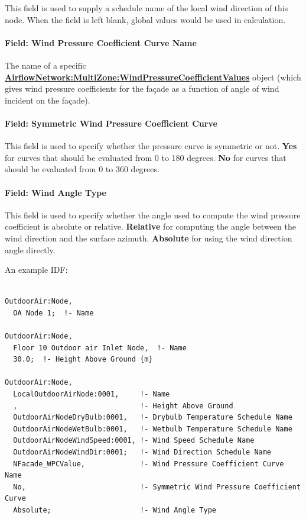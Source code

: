 This field is used to supply a schedule name of the local wind direction of this node. When the field is left blank, global values would be used in calculation.

\paragraph{Field: Wind Pressure Coefficient Curve Name}\label{field-wind-pressure-coeff-curve-name}

The name of a specific \textbf{\hyperref[airflownetworkmultizonewindpressurecoefficientvalues]{AirflowNetwork:MultiZone:WindPressureCoefficientValues}} object (which gives wind pressure coefficients for the façade as a function of angle of wind incident on the façade).

\paragraph{Field: Symmetric Wind Pressure Coefficient Curve}\label{field-sym-windp-curve-name}

This field is used to specify whether the pressure curve is symmetric or not. \textbf{Yes} for curves that should be evaluated from 0 to 180 degrees. \textbf{No} for curves that should be evaluated from 0 to 360 degrees.

\paragraph{Field: Wind Angle Type}\label{field-wind-angle-type}

This field is used to specify whether the angle used to compute the wind pressure coefficient is absolute or relative. \textbf{Relative} for computing the angle between the wind direction and the surface azimuth. \textbf{Absolute} for using the wind direction angle directly.

An example IDF:

\begin{lstlisting}

OutdoorAir:Node,
  OA Node 1;  !- Name

OutdoorAir:Node,
  Floor 10 Outdoor air Inlet Node,  !- Name
  30.0;  !- Height Above Ground {m}

OutdoorAir:Node,
  LocalOutdoorAirNode:0001,     !- Name
  ,                             !- Height Above Ground
  OutdoorAirNodeDryBulb:0001,   !- Drybulb Temperature Schedule Name
  OutdoorAirNodeWetBulb:0001,   !- Wetbulb Temperature Schedule Name
  OutdoorAirNodeWindSpeed:0001, !- Wind Speed Schedule Name
  OutdoorAirNodeWindDir:0001;   !- Wind Direction Schedule Name
  NFacade_WPCValue,             !- Wind Pressure Coefficient Curve Name
  No,                           !- Symmetric Wind Pressure Coefficient Curve
  Absolute;                     !- Wind Angle Type
\end{lstlisting}

